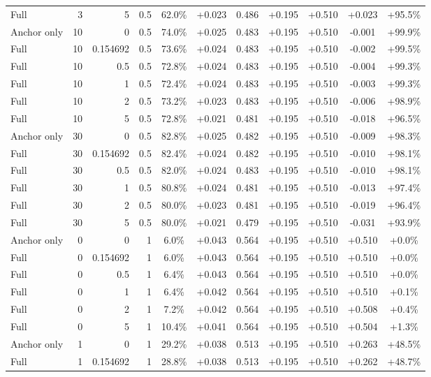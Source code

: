 \begin{table}[htbp]
\begin{tabular}{lrrrccccccc}
Full & 3 & 5 & 0.5 & 62.0\% & +0.023 & 0.486 & +0.195 & +0.510 & +0.023 & +95.5\% \\
Anchor only & 10 & 0 & 0.5 & 74.0\% & +0.025 & 0.483 & +0.195 & +0.510 & -0.001 & +99.9\% \\
Full & 10 & 0.154692 & 0.5 & 73.6\% & +0.024 & 0.483 & +0.195 & +0.510 & -0.002 & +99.5\% \\
Full & 10 & 0.5 & 0.5 & 72.8\% & +0.024 & 0.483 & +0.195 & +0.510 & -0.004 & +99.3\% \\
Full & 10 & 1 & 0.5 & 72.4\% & +0.024 & 0.483 & +0.195 & +0.510 & -0.003 & +99.3\% \\
Full & 10 & 2 & 0.5 & 73.2\% & +0.023 & 0.483 & +0.195 & +0.510 & -0.006 & +98.9\% \\
Full & 10 & 5 & 0.5 & 72.8\% & +0.021 & 0.481 & +0.195 & +0.510 & -0.018 & +96.5\% \\
Anchor only & 30 & 0 & 0.5 & 82.8\% & +0.025 & 0.482 & +0.195 & +0.510 & -0.009 & +98.3\% \\
Full & 30 & 0.154692 & 0.5 & 82.4\% & +0.024 & 0.482 & +0.195 & +0.510 & -0.010 & +98.1\% \\
Full & 30 & 0.5 & 0.5 & 82.0\% & +0.024 & 0.483 & +0.195 & +0.510 & -0.010 & +98.1\% \\
Full & 30 & 1 & 0.5 & 80.8\% & +0.024 & 0.481 & +0.195 & +0.510 & -0.013 & +97.4\% \\
Full & 30 & 2 & 0.5 & 80.0\% & +0.023 & 0.481 & +0.195 & +0.510 & -0.019 & +96.4\% \\
Full & 30 & 5 & 0.5 & 80.0\% & +0.021 & 0.479 & +0.195 & +0.510 & -0.031 & +93.9\% \\
Anchor only & 0 & 0 & 1 & 6.0\% & +0.043 & 0.564 & +0.195 & +0.510 & +0.510 & +0.0\% \\
Full & 0 & 0.154692 & 1 & 6.0\% & +0.043 & 0.564 & +0.195 & +0.510 & +0.510 & +0.0\% \\
Full & 0 & 0.5 & 1 & 6.4\% & +0.043 & 0.564 & +0.195 & +0.510 & +0.510 & +0.0\% \\
Full & 0 & 1 & 1 & 6.4\% & +0.042 & 0.564 & +0.195 & +0.510 & +0.510 & +0.1\% \\
Full & 0 & 2 & 1 & 7.2\% & +0.042 & 0.564 & +0.195 & +0.510 & +0.508 & +0.4\% \\
Full & 0 & 5 & 1 & 10.4\% & +0.041 & 0.564 & +0.195 & +0.510 & +0.504 & +1.3\% \\
Anchor only & 1 & 0 & 1 & 29.2\% & +0.038 & 0.513 & +0.195 & +0.510 & +0.263 & +48.5\% \\
Full & 1 & 0.154692 & 1 & 28.8\% & +0.038 & 0.513 & +0.195 & +0.510 & +0.262 & +48.7\% \\

\end{tabular}
\end{table}
